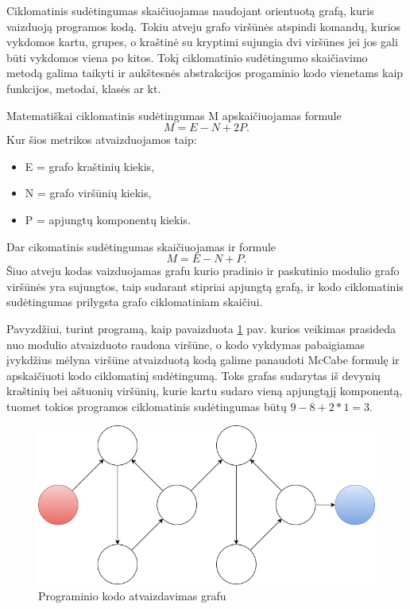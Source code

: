 \documentclass{VUMIFPSbakalaurinis}
\begin{document}
Ciklomatinis sudėtingumas skaičiuojamas naudojant orientuotą grafą, kuris vaizduoją programos kodą. Tokiu atveju grafo viršūnės atspindi komandų, kurios vykdomos kartu, grupes, o kraštinė su kryptimi sujungia dvi viršūnes jei jos gali būti vykdomos viena po kitos. Tokį ciklomatinio sudėtingumo skaičiavimo metodą galima taikyti ir aukštesnės abstrakcijos progaminio kodo vienetams kaip funkcijos, metodai, klasės ar kt.

Matematiškai ciklomatinis sudėtingumas M apskaičiuojamas formule \[M = E - N + 2P.\] Kur šios metrikos atvaizduojamos taip:
\begin{itemize}  
\item[] E = grafo kraštinių kiekis,
\item[] N = grafo viršūnių kiekis,
\item[] P = apjungtų komponentų kiekis.
\end{itemize} 
Dar cikomatinis sudėtingumas skaičiuojamas ir formule \[M = E - N + P.\] Šiuo atveju kodas vaizduojamas grafu kurio pradinio ir paskutinio modulio grafo viršūnės yra sujungtos, taip sudarant stipriai apjungtą grafą, ir kodo ciklomatinis sudėtingumas prilygsta grafo ciklomatiniam skaičiui.

Pavyzdžiui, turint programą, kaip pavaizduota \ref{img:Cyclomatic_graph_1} pav. kurios veikimas prasideda nuo modulio atvaizduoto raudona viršūne, o kodo vykdymas pabaigiamas įvykdžius mėlyna viršūne atvaizduotą kodą galime panaudoti McCabe formulę ir apskaičiuoti kodo ciklomatinį sudėtingumą. Toks grafas sudarytas iš devynių kraštinių bei aštuonių viršūnių, kurie kartu sudaro vieną apjungtąjį komponentą, tuomet tokios programos ciklomatinis sudėtingumas būtų \(9 - 8 + 2 * 1 = 3\).

\begin{figure}[H]
    \centering
    \includegraphics[scale=0.6]{img/Cyclomatic_graph_1}
    \caption{Programinio kodo atvaizdavimas grafu}
    \label{img:Cyclomatic_graph_1}
\end{figure}
\end{document}
